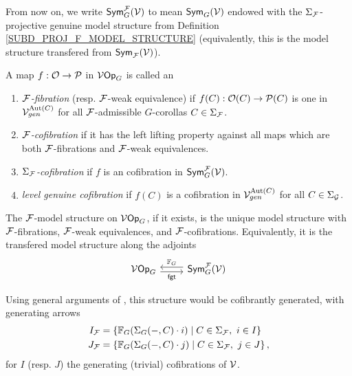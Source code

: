\documentclass[a4paper,10pt]{article}%
\begin{document}
From now on, we write $\mathsf{Sym}_G^{\mathcal F}(\mathcal V)$ to mean $\mathsf{Sym}_G(\mathcal V)$ endowed with the $\Sigma_{\mathcal F}$-projective genuine model structure from Definition \ref{SUBD_PROJ_F_MODEL_STRUCTURE} (equivalently, this is the model structure transfered from $\mathsf{Sym}_{\mathcal F}(\mathcal V)$).

\begin{definition} 
  A map $f: \mathcal{O} \to \mathcal{P}$ in $\mathcal V\mathsf{Op}_G$ is called an  
  \begin{enumerate} 
  \item \textit{$\mathcal F$-fibration} (resp. $\mathcal F$-weak equivalence) if $f(C):\mathcal{O}(C) \to \mathcal{P}(C)$ is one in $\mathcal V^{\mathrm{Aut}(C)}_{gen}$ for all $\mathcal F$-admissible $G$-corollas $C\in\Sigma_{\mathcal F}$. 
  \item \textit{$\mathcal F$-cofibration} if it has the left lifting property against all maps which are both $\mathcal F$-fibrations and $\mathcal F$-weak equivalences. 
  \item \textit{$\Sigma_{\mathcal F}$-cofibration} if $f$ is an cofibration in $\mathsf{Sym}_G^{\mathcal F}(\mathcal V)$. 
  \item \textit{level genuine cofibration} if $f(C)$ is a cofibration in $\mathcal V^{\mathrm{Aut}(C)}_{gen}$ for all $C\in \Sigma_{\mathcal{G}}$. 
  \end{enumerate} 
\end{definition} 


\begin{definition} 
 The $\mathcal F$-model structure on $\mathcal V\mathsf{Op}_G$, if it exists, is the unique model structure with $\mathcal F$-fibrations, $\mathcal F$-weak equivalences, and $\mathcal F$-cofibrations. Equivalently, it is the transfered model structure along the adjoints 
\[ 
\begin{tikzcd} 
  \V\Op_G \arrow[r, shift right, "\mathsf{fgt}"'] & \Sym_G^\F(\V) \arrow[l, shift right, "\mathbb F_G"']
\end{tikzcd} 
\] 
\end{definition} 

Using general arguments of \cite{Hi03}, this structure would be cofibrantly generated, with generating arrows 
\begin{align*} 
  I_{\mathcal F} &= \left\{ \mathbb F_G(\Sigma_G(-,C) \cdot i) \;|\; C \in \Sigma_{\mathcal F},\ i\in I\right\}\\ 
  J_{\mathcal F} &= \left\{ \mathbb F_G(\Sigma_G(-,C) \cdot j) \;|\; C \in \Sigma_{\mathcal F},\ j\in J\right\}, 
\end{align*} 
for $I$ (resp. $J$) the generating (trivial) cofibrations of $\mathcal V$. 
\end{document}
